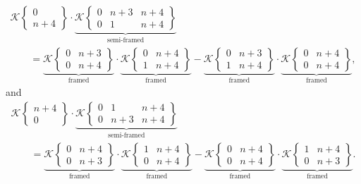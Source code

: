 \documentclass[10pt,a4paper]{amsart}
\numberwithin{equation}{section}
\begin{document}
\begin{gather}
\\
 \mathscr{K}\left\lbrace \begin{matrix} 0 \\ n+4 \end{matrix} \right\rbrace
			\cdot \underbrace{ \mathscr{K}\left\lbrace \begin{matrix} 0 & n+3 & n+4 \\ 0 & 1 & n+4 \end{matrix} \right\rbrace }_{\text{semi-framed}} \nonumber\\
\qquad= \underbrace{\mathscr{K}\left\lbrace \begin{matrix} 0 & n+3 \\ 0 & n+4 \end{matrix} \right\rbrace}_{\text{framed}} \cdot \underbrace{\mathscr{K}\left\lbrace \begin{matrix} 0 & n+4 \\ 1 & n+4 \end{matrix} \right\rbrace}_{\text{framed}} - \underbrace{\mathscr{K}\left\lbrace \begin{matrix} 0 & n+3 \\ 1 & n+4 \end{matrix} \right\rbrace}_{\text{framed}} \cdot \underbrace{\mathscr{K}\left\lbrace \begin{matrix} 0 & n+4 \\ 0 & n+4 \end{matrix} \right\rbrace}_{\text{framed}},\nonumber
		\end{gather}
		and
		\begin{gather}
\mathscr{K}\left\lbrace \begin{matrix} n+4 \\ 0 \end{matrix} \right\rbrace
			\cdot \underbrace{ \mathscr{K}\left\lbrace \begin{matrix} 0 & 1 & n+4 \\ 0 & n+3 & n+4 \end{matrix} \right\rbrace }_{\text{semi-framed}} \nonumber\\
\qquad= \underbrace{\mathscr{K}\left\lbrace \begin{matrix} 0 & n+4 \\ 0 & n+3 \end{matrix} \right\rbrace}_{\text{framed}} \cdot \underbrace{\mathscr{K}\left\lbrace \begin{matrix} 1 & n+4 \\ 0 & n+4 \end{matrix} \right\rbrace}_{\text{framed}} - \underbrace{\mathscr{K}\left\lbrace \begin{matrix} 0 & n+4 \\ 0 & n+4 \end{matrix} \right\rbrace}_{\text{framed}} \cdot \underbrace{\mathscr{K}\left\lbrace \begin{matrix} 1 & n+4 \\ 0 & n+3 \end{matrix} \right\rbrace}_{\text{framed}}.\label{DODGSON framed F}
		\end{gather}
\end{document}
